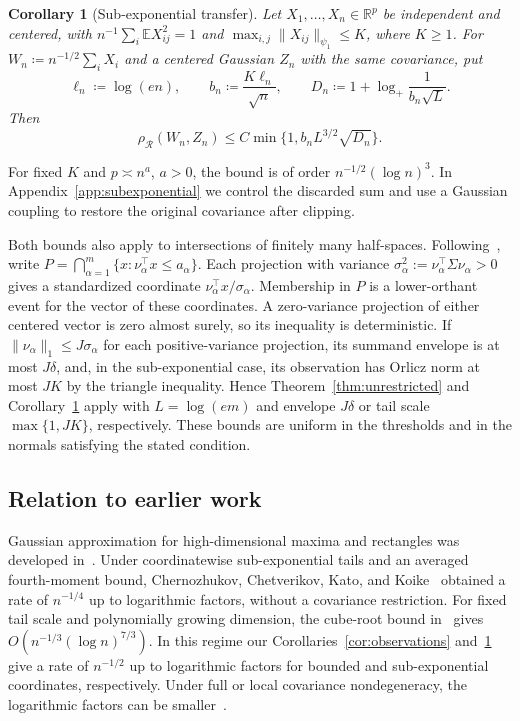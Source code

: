 \documentclass[11pt,letterpaper]{article}
\newtheorem{corollary}{Corollary}
\theoremstyle{remark}
\newcommand{\E}{\mathbb E}
\newcommand{\R}{\mathbb R}
\newcommand{\rh}{\rho_{\mathcal R}}
\begin{document}
\begin{corollary}[Sub-exponential transfer]\label{cor:subexponential}
Let \(X_1,\ldots,X_n\in\R^p\) be independent and centered, with
\(n^{-1}\sum_i\E X_{ij}^2=1\) and
\(\max_{i,j}\|X_{ij}\|_{\psi_1}\le K\), where \(K\ge1\).
For \(W_n\coloneqq n^{-1/2}\sum_iX_i\) and a centered Gaussian \(Z_n\)
with the same covariance, put
\[
 \ell_n\coloneqq \log(en),\qquad b_n\coloneqq \frac{K\ell_n}{\sqrt n},\qquad
 D_n\coloneqq 1+\log_+\frac1{b_n\sqrt L}.
\]
Then
\begin{equation}
 \rh(W_n,Z_n)\le C\min\{1,b_nL^{3/2}\sqrt{D_n}\}.
 \label{eq:subexponential}
\end{equation}

\end{corollary}

For fixed \(K\) and \(p\asymp n^a\), \(a>0\), the bound is of order
\(n^{-1/2}(\log n)^3\). In Appendix~\ref{app:subexponential} we
control the discarded sum and use a Gaussian coupling to restore
the original covariance after clipping.

Both bounds also apply to intersections of finitely many half-spaces.
Following~\cite[Section~3.1]{CCK2017}, write \(P=\bigcap_{\alpha=1}^m
\{x:\nu_\alpha^\top x\le a_\alpha\}\). Each projection with variance
\(\sigma_\alpha^2:=\nu_\alpha^\top\Sigma\nu_\alpha>0\) gives a standardized
coordinate \(\nu_\alpha^\top x/\sigma_\alpha\). Membership in \(P\) is a
lower-orthant event for the vector of these coordinates. A zero-variance
projection of either centered vector is zero almost surely, so its
inequality is deterministic. If \(\|\nu_\alpha\|_1\le J\sigma_\alpha\)
for each positive-variance projection, its summand envelope is at most
\(J\delta\), and, in the sub-exponential case, its observation has Orlicz
norm at most \(JK\) by the triangle inequality. Hence
Theorem~\ref{thm:unrestricted} and Corollary~\ref{cor:subexponential}
apply with \(L=\log(em)\) and envelope \(J\delta\) or tail scale
\(\max\{1,JK\}\), respectively. These bounds are uniform in the
thresholds and in the normals satisfying the stated condition.

\subsection{Relation to earlier work}
Gaussian approximation for high-dimensional maxima and rectangles was
developed in~\cite{CCK2013,CCK2017}. Under coordinatewise sub-exponential
tails and an averaged fourth-moment bound, Chernozhukov, Chetverikov,
Kato, and Koike~\cite[Theorem~2.1]{CCKK2022} obtained a rate of
\(n^{-1/4}\) up to logarithmic factors, without a covariance restriction.
For fixed tail scale and polynomially growing dimension, the cube-root
bound in~\cite[Theorem~1]{GaoZhang} gives \(O(n^{-1/3}(\log n)^{7/3})\).
In this regime our Corollaries~\ref{cor:observations}
and~\ref{cor:subexponential} give a rate of \(n^{-1/2}\) up to logarithmic
factors for bounded and sub-exponential coordinates, respectively.
Under full or local covariance nondegeneracy, the logarithmic factors
can be smaller~\cite{CCK,AL,FKLZ,Local}.
\end{document}
